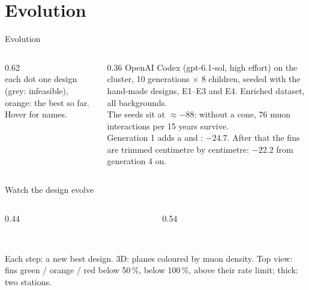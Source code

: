 \documentclass[aspectratio=169,10pt]{beamer}
\newcommand{\sld}[2][\linewidth]{\livewidget{#2}{#1}{0.62cm}}
\newcommand{\legendline}[1]{{\color{muted}\lightfont\scriptsize #1}}
\begin{document}
\section{Evolution}

\begin{frame}{Evolution}
  \begin{columns}[c]
    \begin{column}{0.62\textwidth}
      \\[0.5mm]
      \legendline{each dot one design (grey: infeasible), orange: the best so far. Hover for names.}
    \end{column}
    \begin{column}{0.36\textwidth}\footnotesize
      OpenAI Codex (gpt-6.1-sol, high effort) on the cluster, 10 generations $\times$ 8 children, seeded with the hand-made designs, E1--E3 and E4. Enriched dataset, all backgrounds.\\[1.5mm]
      The seeds sit at $\approx -88$: without a cone, 76 muon interactions per 15 years survive.\\[1mm]
      Generation 1 adds a  and : $-24.7$. After that the fins are trimmed centimetre by centimetre: $-22.2$ from generation 4 on.\\[1.5mm]
    \end{column}
  \end{columns}
\end{frame}

\begin{frame}{Watch the design evolve}
  \begin{columns}[c]
    \begin{column}{0.44\textwidth}
    \end{column}
    \begin{column}{0.54\textwidth}
    \end{column}
  \end{columns}
  \vspace{1mm}
  \sld[0.6\linewidth]{evo_step}\\[0.3mm]
  \legendline{Each step: a new best design. 3D: planes coloured by muon density. Top view: fins green / orange / red below 50\,\%, below 100\,\%, above their rate limit; thick: two stations.}
\end{frame}
\end{document}

